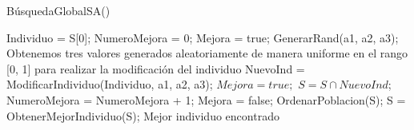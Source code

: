 
\begin{algorithm}[!ht]
  \caption{BúsquedaGlobalSA(\mbox{})}
  \label{pseu:bg}
  \begin{algorithmic}[1]
    \STATE Individuo = S[0];
    \STATE NumeroMejora = 0;
      \STATE Mejora = true;
          \STATE GenerarRand(a1, a2, a3); Obtenemos tres valores generados aleatoriamente de manera uniforme en el rango [0, 1] para realizar la modificación del individuo
        \ENDWHILE
        \STATE NuevoInd = ModificarIndividuo(Individuo, a1, a2, a3);
          \STATE $Mejora = true;$
          \STATE $S = S \cap NuevoInd$;
          \STATE NumeroMejora = NumeroMejora + 1;
          \ELSE
            \STATE Mejora = false;
        \ENDIF
      \ENDWHILE
    \ENDWHILE
    \STATE OrdenarPoblacion(S); 
    \STATE S = ObtenerMejorIndividuo(S);
    \RETURN Mejor individuo encontrado
  \end{algorithmic}
\end{algorithm}
